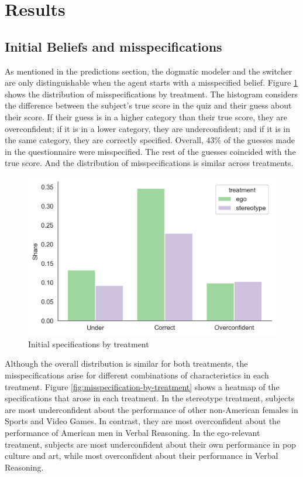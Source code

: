 \documentclass[
  12pt,
]{article}
\begin{document}
\hypertarget{results}{%
\section{Results}\label{results}}

\hypertarget{initial-beliefs-and-misspecifications}{%
\subsection{Initial Beliefs and
misspecifications}\label{initial-beliefs-and-misspecifications}}

As mentioned in the predictions section, the dogmatic modeler and the
switcher are only distinguishable when the agent starts with a
misspecified belief. Figure \ref{fig:misspecification-hist} shows the
distribution of misspecifications by treatment. The histogram considers
the difference between the subject's true score in the quiz and their
guess about their score. If their guess is in a higher category than
their true score, they are overconfident; if it is in a lower category,
they are underconfident; and if it is in the same category, they are
correctly specified. Overall, 43\% of the guesses made in the
questionnaire were misspecified. The rest of the guesses coincided with
the true score. And the distribution of misspecifications is similar
across treatments.

\begin{figure}
\hypertarget{fig:misspecification-hist}{%
\centering
\includegraphics{../figures/misspecification_hist.png}
\caption{Initial specifications by
treatment}\label{fig:misspecification-hist}
}
\end{figure}

Although the overall distribution is similar for both treatments, the
misspecifications arise for different combinations of characteristics in
each treatment. Figure \ref{fig:misspecification-by-treatment} shows a
heatmap of the specifications that arose in each treatment. In the
stereotype treatment, subjects are most underconfident about the
performance of other non-American females in Sports and Video Games. In
contrast, they are most overconfident about the performance of American
men in Verbal Reasoning. In the ego-relevant treatment, subjects are
most underconfident about their own performance in pop culture and art,
while most overconfident about their performance in Verbal Reasoning.
\end{document}
